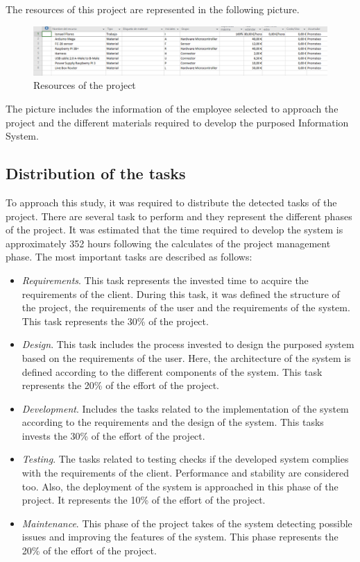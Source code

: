 The resources of this project are represented in the following picture.

\begin{figure}[H]
\begin{centering}
\includegraphics[scale=0.5]{IMGS/resources_project.PNG}
\caption{Resources of the project \label{Scrum methodology}}
\end{centering}
\end{figure}

The picture includes the information of the employee selected to approach the project and the different materials required to develop the purposed Information System.

\subsection{Distribution of the tasks}

To approach this study, it was required to distribute the detected tasks of the project. There are several task to perform and they represent the different phases of the project. It was estimated that the time required to develop the system is approximately 352 hours following the calculates of the project management phase. The most important tasks are described as follows:

\begin{itemize}

\item \textit{Requirements}. This task represents the invested time to acquire the requirements of the client. During this task, it was defined the structure of the project, the requirements of the user and the requirements of the system. This task represents the 30\% of the project. 
\item \textit{Design}. This task includes the process invested to design the purposed system based on the requirements of the user. Here, the architecture of the system is defined according to the different components of the system. This task represents the 20\% of the effort of the project.
\item \textit{Development}. Includes the tasks related to the implementation of the system according to the requirements and the design of the system. This tasks invests the 30\% of the effort of the project.
\item \textit{Testing}. The tasks related to testing checks if the developed system complies with the requirements of the client. Performance and stability are considered too. Also, the deployment of the system is approached in this phase of the project. It represents the 10\% of the effort of the project.
\item \textit{Maintenance}. This phase of the project takes of the system detecting possible issues and improving the features of the system. This phase represents the 20\% of the effort of the project. 

\end{itemize}

\newpage
\newpage